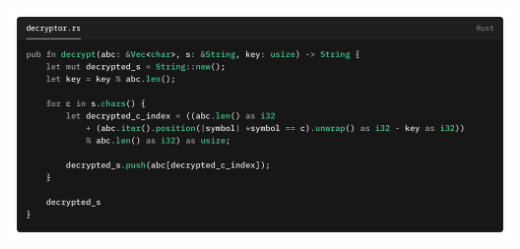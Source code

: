 \documentclass[a4paper]{report}
\begin{document}
\includegraphics[width=1\textwidth]{images/caesar_cipher_decryptor.png}
\end{document}
